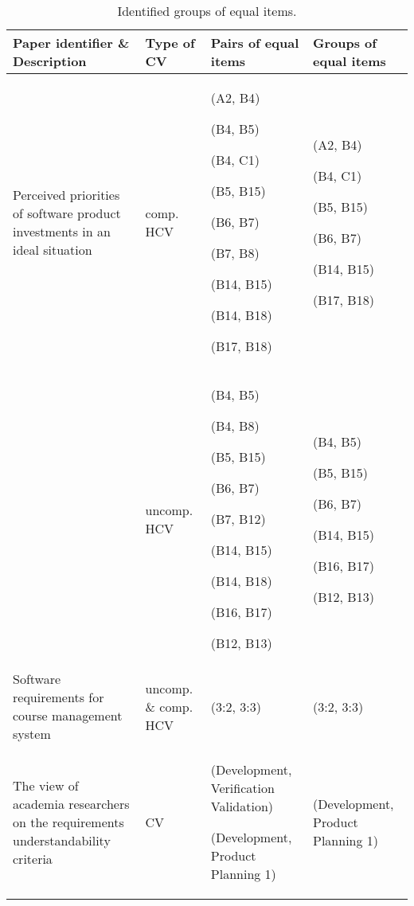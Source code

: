 \begin{table*}%
\scriptsize
\caption{\label{tab:ECVresult}Identified groups of equal items.}

\begin{tabular}{|>{\centering}p{}|>{\centering}p{}|>{\centering}p{}|>{\centering}p{}|}
\hline 
Paper identifier \& Description  & Type of CV  & Pairs of equal items  & Groups of equal items\tabularnewline
\hline 
\citet{Barney2009} Perceived priorities of software product investments
in an ideal situation  & comp. HCV & (A2, B4)

(B4, B5)

(B4, C1)

(B5, B15)

(B6, B7)

(B7, B8)

(B14, B15)

(B14, B18)

(B17, B18) & (A2, B4)

(B4, C1)

(B5, B15)

(B6, B7)

(B14, B15)

(B17, B18)\tabularnewline
\cline{2-4}
 & uncomp. HCV & (B4, B5)

(B4, B8)

(B5, B15)

(B6, B7)

(B7, B12)

(B14, B15)

(B14, B18)

(B16, B17)

(B12, B13) & (B4, B5)

(B5, B15)

(B6, B7)

(B14, B15)

(B16, B17)

(B12, B13)\tabularnewline
\hline 
\citet{Berander2009a} Software requirements for course management system  & uncomp. \& comp. HCV  & (3:2, 3:3) & (3:2, 3:3)\tabularnewline
\hline 
\citet{Svahnberg2008} The view of academia researchers
on the requirements understandability criteria  & CV & (Development, Verification Validation)

(Development, Product Planning 1) & (Development, Product Planning 1)\tabularnewline
\hline
\end{tabular}%
\end{table*}


